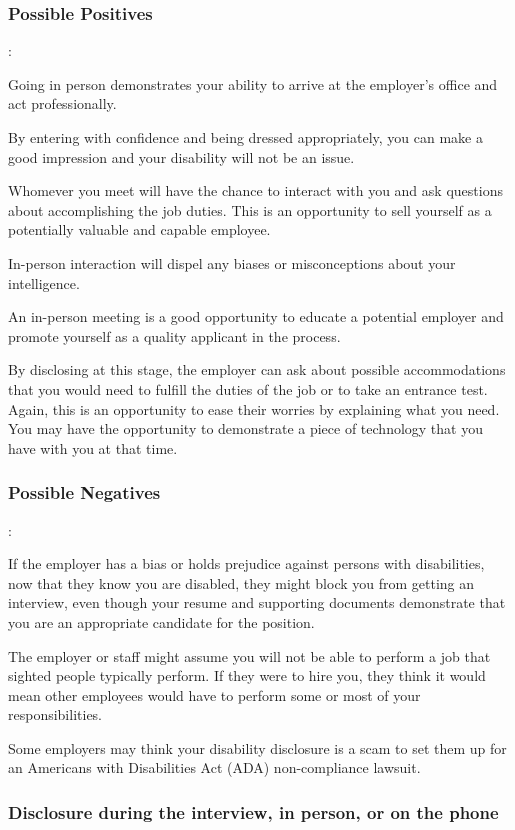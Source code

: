 \subsubsection*{Possible Positives}:

Going in person demonstrates your ability to arrive at the employer's office and act professionally.

By entering with confidence and being dressed appropriately, you can make a good impression and your disability will not be an issue.

Whomever you meet will have the chance to interact with you and ask questions about accomplishing the job duties. This is an opportunity to sell yourself as a potentially valuable and capable employee.

In-person interaction will dispel any biases or misconceptions about your intelligence.

An in-person meeting is a good opportunity to educate a potential employer and promote yourself as a quality applicant in the process.

By disclosing at this stage, the employer can ask about possible accommodations that you would need to fulfill the duties of the job or to take an entrance test. Again, this is an opportunity to ease their worries by explaining what you need. You may have the opportunity to demonstrate a piece of technology that you have with you at that time.

\subsubsection*{Possible Negatives}:

If the employer has a bias or holds prejudice against persons with disabilities, now that they know you are disabled, they might block you from getting an interview, even though your resume and supporting documents demonstrate that you are an appropriate candidate for the position.

The employer or staff might assume you will not be able to perform a job that sighted people typically perform. If they were to hire you, they think it would mean other employees would have to perform some or most of your responsibilities.

Some employers may think your disability disclosure is a scam to set them up for an Americans with Disabilities Act (ADA) non-compliance lawsuit.

\subsubsection*{Disclosure during the interview, in person, or on the phone}

